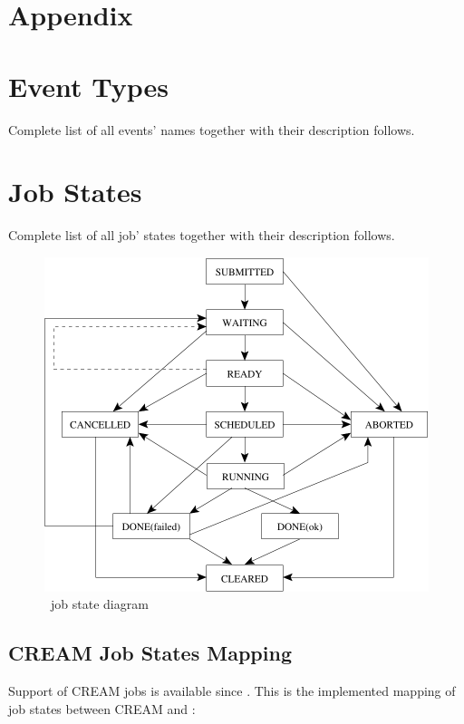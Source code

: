 %
%
\section*{Appendix}

\section{\LB Event Types}
\label{a:events}
Complete list of all events' names together with their description follows.


\newpage
\section{\LB Job States}
\label{a:jobstat}
Complete list of all job' states together with their description follows.


\begin{figure}[h]
\centering
\includegraphics[width=.6\hsize]{images/wms2-jobstat}
\caption{\LB\ job state diagram}
\end{figure}

\newpage
\subsection{CREAM Job States Mapping}
Support of CREAM jobs is available since . This is the implemented
mapping of job states between CREAM and \LB:
\label{a:creammapping}

